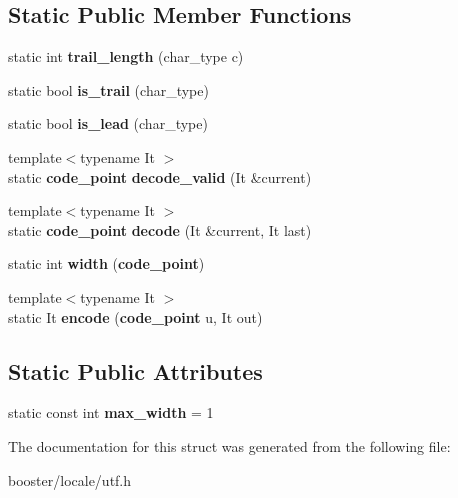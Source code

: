 \subsection*{Static Public Member Functions}
\begin{DoxyCompactItemize}
\item 
static int {\bfseries trail\-\_\-length} (char\-\_\-type c)\label{structbooster_1_1locale_1_1utf_1_1utf__traits_3_01CharType_00_014_01_4_a7495d5f1a40d322c3aa31538e8ac8ed9}

\item 
static bool {\bfseries is\-\_\-trail} (char\-\_\-type)\label{structbooster_1_1locale_1_1utf_1_1utf__traits_3_01CharType_00_014_01_4_a45e91c957414c7db0ddc55b4dee72861}

\item 
static bool {\bfseries is\-\_\-lead} (char\-\_\-type)\label{structbooster_1_1locale_1_1utf_1_1utf__traits_3_01CharType_00_014_01_4_a4cebda25077792ef3301af64a7c59ef1}

\item 
{\footnotesize template$<$typename It $>$ }\\static {\bf code\-\_\-point} {\bfseries decode\-\_\-valid} (It \&current)\label{structbooster_1_1locale_1_1utf_1_1utf__traits_3_01CharType_00_014_01_4_acf7afcb5bf50b0ed0194588da2939e97}

\item 
{\footnotesize template$<$typename It $>$ }\\static {\bf code\-\_\-point} {\bfseries decode} (It \&current, It last)\label{structbooster_1_1locale_1_1utf_1_1utf__traits_3_01CharType_00_014_01_4_a5937c23b67318efa7a5950b0f549e755}

\item 
static int {\bfseries width} ({\bf code\-\_\-point})\label{structbooster_1_1locale_1_1utf_1_1utf__traits_3_01CharType_00_014_01_4_a3f89516cc122545d14c953c824f937f5}

\item 
{\footnotesize template$<$typename It $>$ }\\static It {\bfseries encode} ({\bf code\-\_\-point} u, It out)\label{structbooster_1_1locale_1_1utf_1_1utf__traits_3_01CharType_00_014_01_4_a82f9614fe82f33ca1829c410d8a7f5d5}

\end{DoxyCompactItemize}
\subsection*{Static Public Attributes}
\begin{DoxyCompactItemize}
\item 
static const int {\bfseries max\-\_\-width} = 1\label{structbooster_1_1locale_1_1utf_1_1utf__traits_3_01CharType_00_014_01_4_aebcb701e76251c9a913929ac2682fba9}

\end{DoxyCompactItemize}


The documentation for this struct was generated from the following file\-:\begin{DoxyCompactItemize}
\item 
booster/locale/utf.\-h\end{DoxyCompactItemize}
